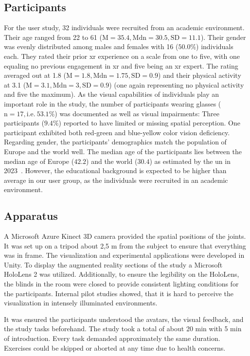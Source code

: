 \subsection{Participants}
For the user study, 32 individuals were recruited from an academic environment. Their age ranged from 22 to 61 (\(\mathrm{M} = 35.4, \mathrm{Mdn} = 30.5, \mathrm{SD} = 11.1\)). Their gender was evenly distributed among males and females with 16 (\(50.0\%\)) individuals each. They rated their prior \acrshort{xr} experience on a scale from one to five, with one equaling no previous engagement in \acrshort{xr} and five being an \acrshort{xr} expert. The rating averaged out at 1.8 (\(\mathrm{M}=1.8, \mathrm{Mdn} = 1.75, \mathrm{SD} = 0.9\)) and their physical activity at 3.1 (\(\mathrm{M}=3.1, \mathrm{Mdn} = 3, \mathrm{SD} = 0.9\)) (one again representing no physical activity and five the maximum). As the visual capabilities of individuals play an important role in the study, the number of participants wearing glasses (\(\mathrm{n} = 17, \mathrm{i.e.}~53.1\%\)) was documented as well as visual impairments: Three participants (\(9.4\%\)) reported to have limited or missing spatial perception. One participant exhibited both red-green and blue-yellow color vision deficiency. Regarding gender, the participants' demographics match the population of Europe and the world well. The median age of the participants lies between the median age of Europe (\(42.2\)) and the world (\(30.4\)) as estimated by the \acrshort{un} in 2023~\cite{united2022world}. However, the educational background is expected to be higher than average in our user group, as the individuals were recruited in an academic environment.


\subsection{Apparatus}
A Microsoft Azure Kinect 3D camera provided the spatial positions of the joints. It was set up on a tripod about 2,5 m from the subject to ensure that everything was in frame. The visualization and experimental applications were developed in Unity. To display the augmented reality sections of the study a Microsoft HoloLens 2 was utilized. Additionally, to ensure the legibility on the HoloLens, the blinds in the room were closed to provide consistent lighting conditions for the participants. Internal pilot studies showed, that it is hard to perceive the visualization in intensely illuminated environments.

It was ensured the participants understood the avatars, the visual feedback, and the study tasks beforehand. The study took a total of about 20 min with 5 min of introduction. Every task demanded approximately the same duration. Exercises could be skipped or aborted at any time due to health concerns.

